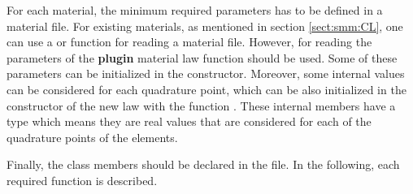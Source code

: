 For each material, the minimum required parameters has to be defined in a
material file.  For existing materials, as mentioned in section
\ref{sect:smm:CL}, one can use a  or 
function for reading a material file. However, for reading the parameters of the
\textbf{plugin} material law  function should be
used. Some of these parameters can be initialized in the constructor. Moreover,
some internal values can be considered for each quadrature point, which can be
also initialized in the constructor of the new law with the function
. These internal members have a
 type which means they are real values that are
considered for each of the quadrature points of the elements.



Finally, the class members should be declared in the 
file. In the following, each required function is described.


